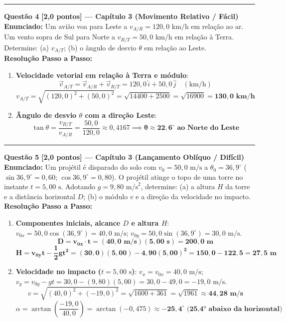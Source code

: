 \documentclass[10pt,a4paper]{article}
\begin{document}
\vspace{6mm}
\hrule
\vspace{6mm}

\noindent\textbf{\large Questão 4} \hfill \textbf{[2,0 pontos] --- Capítulo 3 (Movimento Relativo / Fácil)}\\[1.5mm]
\textbf{Enunciado:} Um avião voa para Leste a $v_{A/R} = 120,0\text{ km/h}$ em relação ao ar. Um vento sopra de Sul para Norte a $v_{R/T} = 50,0\text{ km/h}$ em relação à Terra. Determine: (a) $v_{A/T}$; (b) o ângulo de desvio $\theta$ em relação ao Leste.\\[2mm]
\textbf{Resolução Passo a Passo:}
\begin{enumerate}[label=\alph*),itemsep=3pt,topsep=2pt]
    \item \textbf{Velocidade vetorial em relação à Terra e módulo}:
    $$\vec{v}_{A/T} = \vec{v}_{A/R} + \vec{v}_{R/T} = 120,0\,\hat{i} + 50,0\,\hat{j} \quad (\text{km/h})$$
    $$v_{A/T} = \sqrt{(120,0)^2 + (50,0)^2} = \sqrt{14400 + 2500} = \sqrt{16900} = \mathbf{130,0\text{ km/h}}$$

    \item \textbf{Ângulo de desvio $\theta$ com a direção Leste}:
    $$\tan\theta = \frac{v_{R/T}}{v_{A/R}} = \frac{50,0}{120,0} \approx 0,4167 \implies \mathbf{\theta \approx 22,6^\circ\text{ ao Norte do Leste}}$$
\end{enumerate}

\vspace{6mm}
\hrule
\vspace{6mm}

\noindent\textbf{\large Questão 5} \hfill \textbf{[2,0 pontos] --- Capítulo 3 (Lançamento Oblíquo / Difícil)}\\[1.5mm]
\textbf{Enunciado:} Um projétil é disparado do solo com $v_0 = 50,0\text{ m/s}$ a $\theta_0 = 36,9^\circ$ ($\sin 36,9^\circ = 0,60$; $\cos 36,9^\circ = 0,80$). O projétil atinge o topo de uma torre no instante $t = 5,00\text{ s}$. Adotando $g = 9,80\text{ m/s}^2$, determine: (a) a altura $H$ da torre e a distância horizontal $D$; (b) o módulo $v$ e a direção da velocidade no impacto.\\[2mm]
\textbf{Resolução Passo a Passo:}
\begin{enumerate}[label=\alph*),itemsep=3pt,topsep=2pt]
    \item \textbf{Componentes iniciais, alcance $D$ e altura $H$}:
    $v_{0x} = 50,0 \cos(36,9^\circ) = 40,0\text{ m/s}$; \quad $v_{0y} = 50,0 \sin(36,9^\circ) = 30,0\text{ m/s}$.
    $$\mathbf{D = v_{0x} \cdot t = (40,0\text{ m/s})(5,00\text{ s}) = 200,0\text{ m}}$$
    $$\mathbf{H = v_{0y} t - \frac{1}{2} g t^2 = (30,0)(5,00) - 4,90(5,00)^2 = 150,0 - 122,5 = 27,5\text{ m}}$$

    \item \textbf{Velocidade no impacto ($t = 5,00\text{ s}$)}:
    $v_x = v_{0x} = 40,0\text{ m/s}$; \quad $v_y = v_{0y} - g t = 30,0 - (9,80)(5,00) = 30,0 - 49,0 = -19,0\text{ m/s}$.
    $$v = \sqrt{(40,0)^2 + (-19,0)^2} = \sqrt{1600 + 361} = \sqrt{1961} \approx \mathbf{44,28\text{ m/s}}$$
    $$\alpha = \arctan\left(\frac{-19,0}{40,0}\right) = \arctan(-0,475) \approx \mathbf{-25,4^\circ\text{ (25,4° abaixo da horizontal)}}$$
\end{enumerate}
\end{document}
